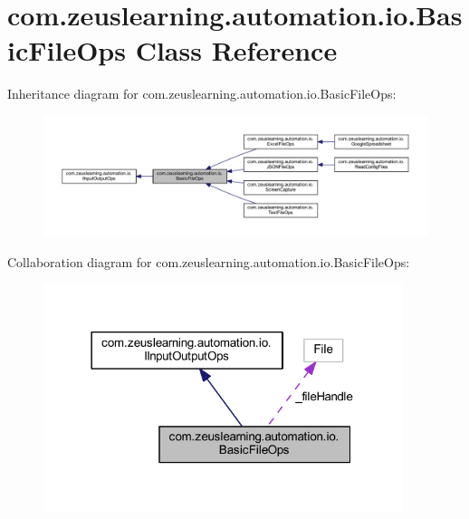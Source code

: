 \hypertarget{classcom_1_1zeuslearning_1_1automation_1_1io_1_1BasicFileOps}{}\section{com.\+zeuslearning.\+automation.\+io.\+Basic\+File\+Ops Class Reference}
\label{classcom_1_1zeuslearning_1_1automation_1_1io_1_1BasicFileOps}


Inheritance diagram for com.\+zeuslearning.\+automation.\+io.\+Basic\+File\+Ops\+:\nopagebreak
\begin{figure}[H]
\begin{center}
\leavevmode
\includegraphics[width=350pt]{d2/d87/classcom_1_1zeuslearning_1_1automation_1_1io_1_1BasicFileOps__inherit__graph}
\end{center}
\end{figure}


Collaboration diagram for com.\+zeuslearning.\+automation.\+io.\+Basic\+File\+Ops\+:\nopagebreak
\begin{figure}[H]
\begin{center}
\leavevmode
\includegraphics[width=297pt]{da/d99/classcom_1_1zeuslearning_1_1automation_1_1io_1_1BasicFileOps__coll__graph}
\end{center}
\end{figure}
